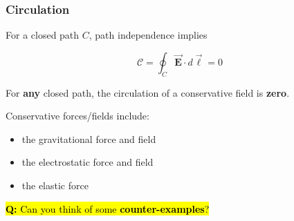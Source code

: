 \documentclass{beamer}
\makeatletter
\newcommand{\vc}[1]{\vec{\boldsymbol{#1}}}
\newcommand{\hi}{\hat{\boldsymbol{i}}}
\let\HL\hl
\renewcommand\hl{%
  \let\set@color\beamerorig@set@color
  \let\reset@color\beamerorig@reset@color
  \HL}
\makeatother
\begin{document}
%
%
%
%


\begin{frame}
\frametitle{Circulation}
\small

For a closed path $C$, path independence implies
\begin{block}{}
	\begin{equation}
	\mathcal{C} = \oint_C  \vc{E} \cdot d \vc{\ell} = 0
\end{equation}
\end{block}
For \textbf{any} closed path, the circulation of a conservative field is \textbf{zero}.\newline
\pause

Conservative forces/fields include:
\begin{itemize}
	\item the gravitational force and field	
	\item the electrostatic force and field
	\item the elastic force 
\end{itemize}

	
\hl{\textbf{Q:} Can you think of some \textbf{counter-examples}?}
\end{frame}
\end{document}
